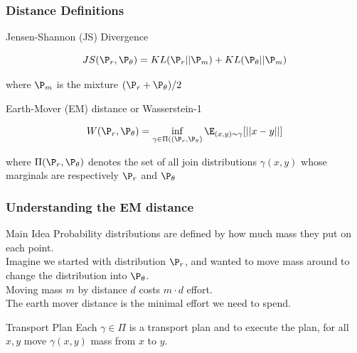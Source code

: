 \documentclass{beamer}
\begin{document}
\begin{frame}
\frametitle{Distance Definitions}

\pause
\begin{block}{Jensen-Shannon (JS) Divergence}

$$ JS(\P_{r}, \P_{\theta}) = KL(\P_{r}||\P_{m}) + KL(\P_{\theta}||\P_{m}) $$

where $\P_{m}$ is the mixture $(\P_{r} + \P_{\theta})/2$ 
\end{block}
\pause
\begin{block}{Earth-Mover (EM) distance or Wasserstein-1}

$$ W(\P_{r},\P_{\theta}) = \inf_{\gamma \in \Pi((\P_{r},\P_{\theta})} \E_{(x,y) \sim \gamma} [ ||x-y|| ] $$

where $\Pi(\P_{r},\P_{\theta})$ denotes the set of all join distributions $\gamma(x,y)$ whose marginals are respectively $\P_{r}$ and $\P_{\theta}$\\
\vspace{2.5pt}
\end{block}

\end{frame}


\begin{frame}
\frametitle{Understanding the EM distance}
\pause
\begin{block}{Main Idea}
Probability distributions are defined by how much mass they put on each point. \\
\vspace{0.12in}
\pause
Imagine we started with distribution $\P_{r}$, and wanted to move mass around to change the distribution into $\P_{\theta}$. \\
\vspace{0.12in}
\pause
Moving mass $m$ by distance $d$ costs $m \cdot d$ effort. \\
\vspace{0.12in}
\pause
The earth mover distance is the minimal effort we need to spend. \\
\end{block}
\pause
\begin{block}{Transport Plan}
Each $\gamma \in \Pi$ is a transport plan and to execute the plan, for all $x,y$ move $\gamma(x,y)$ mass from $x$ to $y$.

\end{block}
\end{frame}
\end{document}
